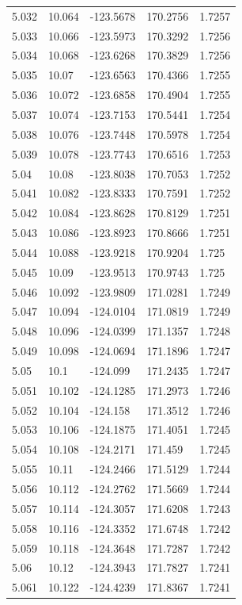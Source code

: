 \begin{tabular}{lllll}
5.032 & 10.064 & -123.5678 & 170.2756 & 1.7257 \\
5.033 & 10.066 & -123.5973 & 170.3292 & 1.7256 \\
5.034 & 10.068 & -123.6268 & 170.3829 & 1.7256 \\
5.035 & 10.07 & -123.6563 & 170.4366 & 1.7255 \\
5.036 & 10.072 & -123.6858 & 170.4904 & 1.7255 \\
5.037 & 10.074 & -123.7153 & 170.5441 & 1.7254 \\
5.038 & 10.076 & -123.7448 & 170.5978 & 1.7254 \\
5.039 & 10.078 & -123.7743 & 170.6516 & 1.7253 \\
5.04 & 10.08 & -123.8038 & 170.7053 & 1.7252 \\
5.041 & 10.082 & -123.8333 & 170.7591 & 1.7252 \\
5.042 & 10.084 & -123.8628 & 170.8129 & 1.7251 \\
5.043 & 10.086 & -123.8923 & 170.8666 & 1.7251 \\
5.044 & 10.088 & -123.9218 & 170.9204 & 1.725 \\
5.045 & 10.09 & -123.9513 & 170.9743 & 1.725 \\
5.046 & 10.092 & -123.9809 & 171.0281 & 1.7249 \\
5.047 & 10.094 & -124.0104 & 171.0819 & 1.7249 \\
5.048 & 10.096 & -124.0399 & 171.1357 & 1.7248 \\
5.049 & 10.098 & -124.0694 & 171.1896 & 1.7247 \\
5.05 & 10.1 & -124.099 & 171.2435 & 1.7247 \\
5.051 & 10.102 & -124.1285 & 171.2973 & 1.7246 \\
5.052 & 10.104 & -124.158 & 171.3512 & 1.7246 \\
5.053 & 10.106 & -124.1875 & 171.4051 & 1.7245 \\
5.054 & 10.108 & -124.2171 & 171.459 & 1.7245 \\
5.055 & 10.11 & -124.2466 & 171.5129 & 1.7244 \\
5.056 & 10.112 & -124.2762 & 171.5669 & 1.7244 \\
5.057 & 10.114 & -124.3057 & 171.6208 & 1.7243 \\
5.058 & 10.116 & -124.3352 & 171.6748 & 1.7242 \\
5.059 & 10.118 & -124.3648 & 171.7287 & 1.7242 \\
5.06 & 10.12 & -124.3943 & 171.7827 & 1.7241 \\
5.061 & 10.122 & -124.4239 & 171.8367 & 1.7241 \\

\end{tabular}

